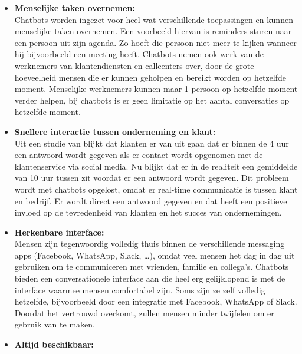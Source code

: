 \begin{itemize}
    \item \textbf{Menselijke taken overnemen:} \\
    
    Chatbots worden ingezet voor heel wat verschillende toepassingen en kunnen menselijke taken overnemen. Een voorbeeld hiervan is reminders sturen naar een persoon uit zijn agenda. Zo hoeft die persoon niet meer te kijken wanneer hij bijvoorbeeld een meeting heeft. Chatbots nemen ook werk van de werknemers van klantendiensten en callcenters over, door de grote hoeveelheid mensen die er kunnen geholpen en bereikt worden op hetzelfde moment. Menselijke werknemers kunnen maar 1 persoon op hetzelfde moment verder helpen, bij chatbots is er geen limitatie op het aantal conversaties op hetzelfde moment. \\
    
    \item \textbf{Snellere interactie tussen onderneming en klant:} \\
    
    Uit een studie van \textcite{Social2016} blijkt dat klanten er van uit gaan dat er binnen de 4 uur een antwoord wordt gegeven als er contact wordt opgenomen met de klantenservice via social media. Nu blijkt dat er in de realiteit een gemiddelde van 10 uur tussen zit voordat er een antwoord wordt gegeven. Dit probleem wordt met chatbots opgelost, omdat er real-time communicatie is tussen klant en bedrijf. Er wordt direct een antwoord gegeven en dat heeft een positieve invloed op de tevredenheid van klanten en het succes van ondernemingen. \\
    
    \item \textbf{Herkenbare interface:} \\
    
    Mensen zijn tegenwoordig volledig thuis binnen de verschillende messaging apps (Facebook, WhatsApp, Slack, …), omdat veel mensen het dag in dag uit gebruiken om te communiceren met vrienden, familie en collega’s. Chatbots bieden een conversationele interface aan die heel erg gelijklopend is met de interface waarmee mensen comfortabel zijn. Soms zijn ze zelf volledig hetzelfde, bijvoorbeeld door een integratie met Facebook, WhatsApp of Slack. Doordat het vertrouwd overkomt, zullen mensen minder twijfelen om er gebruik van te maken. \\
    
    \item \textbf{Altijd beschikbaar:} \\
    

\end{itemize}
